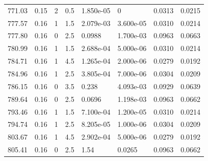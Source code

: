 \documentclass[preview]{standalone}
\begin{document}
{{{\begin{tabular}{L{1.2cm}C{1.2cm} C{0.3cm}C{0.5cm} C{1.4cm}C{1.4cm} C{1.4cm}C{1.4cm}}
  771.03  &  0.15  & 2     & 0.5 &  1.850e-05  & 0  & 0.0313 &  0.0215   \\ 
  777.57  &  0.16  & 1     & 1.5 &  2.079e-03  & 3.600e-05  & 0.0310 &  0.0214   \\ 
  777.80  &  0.16  & 0     & 2.5 &  0.0988  & 1.700e-03  & 0.0963 &  0.0663   \\ 
  780.99  &  0.16  & 1     & 1.5 &  2.688e-04  & 5.000e-06  & 0.0310 &  0.0214   \\ 
  784.71  &  0.16  & 1     & 4.5 &  1.265e-04  & 2.000e-06  & 0.0279 &  0.0192   \\ 
  784.96  &  0.16  & 1     & 2.5 &  3.805e-04  & 7.000e-06  & 0.0304 &  0.0209   \\ 
  786.15  &  0.16  & 0     & 3.5 &  0.238  & 4.093e-03  & 0.0929 &  0.0639   \\ 
  789.64  &  0.16  & 0     & 2.5 &  0.0696  & 1.198e-03  & 0.0963 &  0.0662   \\ 
  793.46  &  0.16  & 1     & 1.5 &  7.100e-04  & 1.200e-05  & 0.0310 &  0.0214   \\ 
  794.74  &  0.16  & 1     & 2.5 &  8.205e-05  & 1.000e-06  & 0.0304 &  0.0209   \\ 
  803.67  &  0.16  & 1     & 4.5 &  2.902e-04  & 5.000e-06  & 0.0279 &  0.0192   \\ 
  805.41  &  0.16  & 0     & 2.5 &  1.54  & 0.0265  & 0.0963 &  0.0662   \\ 
\hline 
\end{tabular} 

}}}
\end{document}
